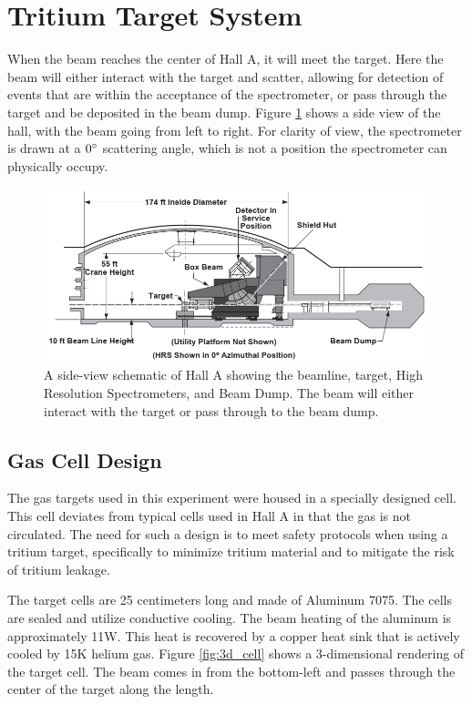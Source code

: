 \section{Tritium Target System}

When the beam reaches the center of Hall A, it will meet the target. Here the beam will either interact with the target and scatter, allowing for detection of events that are within the acceptance of the spectrometer, or pass through the target and be deposited in the beam dump. Figure \ref{fig:ha_side} shows a side view of the hall, with the beam going from left to right. For clarity of view, the spectrometer is drawn at a $0\degree$ scattering angle, which is not a position the spectrometer can physically occupy.

\begin{figure}
\begin{center}
	\includegraphics[width=.8\textwidth]{./setup/fig/HallA_side.png}
	\caption{A side-view schematic of Hall A showing the beamline, target, High Resolution Spectrometers, and Beam Dump. The beam will either interact with the target or pass through to the beam dump.\cite{HANIM}}
	\label{fig:ha_side}
\end{center}
\end{figure}

\subsection{Gas Cell Design}

The gas targets used in this experiment were housed in a specially designed cell. This cell deviates from typical cells used in Hall A in that the gas is not circulated. The need for such a design is to meet safety protocols when using a tritium target, specifically to minimize tritium material and to mitigate the risk of tritium leakage.

The target cells are 25 centimeters long and made of Aluminum 7075. The cells are sealed and utilize conductive cooling. The beam heating of the aluminum is approximately 11W. This heat is recovered by a copper heat sink that is actively cooled by 15K helium gas.\cite{cell_design} Figure \ref{fig:3d_cell} shows a 3-dimensional rendering of the target cell. The beam comes in from the bottom-left and passes through the center of the target along the length.

